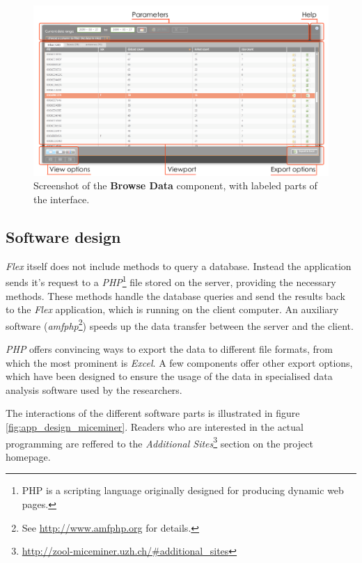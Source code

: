 \begin{figure}[!htbp]
\begin{center}
  \includegraphics[width=.75\textwidth]{assets/pdf/interface_component.pdf}
  \caption[Browse Data component interface]{Screenshot of the \textbf{Browse Data} component, with labeled parts of the interface.}
  \label{fig:interface_component}
\end{center}
\end{figure}

\subsection{Software design}
\label{subsec:miceminer_design}   

\textit{Flex} itself does not include methods to query a database. Instead the application sends it's request to a \textit{PHP}\footnote{PHP is a scripting language originally designed for producing dynamic web pages\cite{wiki:php}.} file stored on the server, providing the necessary methods. These methods handle the database queries and send the results back to the \textit{Flex} application, which is running on the client computer. An auxiliary software (\textit{amfphp}\footnote{See \href{http://www.amfphp.org}{http://www.amfphp.org} for details.}) speeds up the data transfer between the server and the client.

\textit{PHP} offers convincing ways to export the data to different file formats, from which the most prominent is \textit{Excel}. A few components offer other export options, which have been designed to ensure the usage of the data in specialised data analysis software used by the researchers.

The interactions of the different software parts is illustrated in figure \ref{fig:app_design_miceminer}. Readers who are interested in the actual programming are reffered to the \textit{Additional Sites}\footnote{\href{http://zool-miceminer.uzh.ch/\#additional_sites}{http://zool-miceminer.uzh.ch/\#additional\_sites}} section on the project homepage.   

